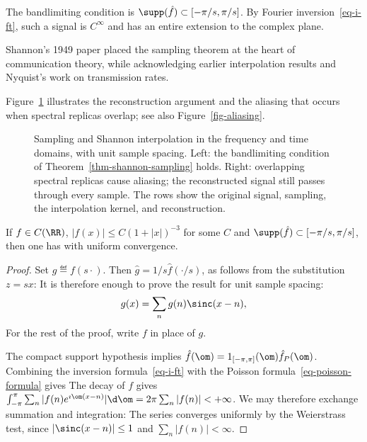 The bandlimiting condition is $\supp(\hat f) \subset [-\pi/s,\pi/s]$. By Fourier inversion~\eqref{eq-i-ft}, such a signal is $C^\infty$ and has an entire extension to the complex plane.
 
Shannon's 1949 paper placed the sampling theorem at the heart of communication theory, while acknowledging earlier interpolation results and Nyquist's work on transmission rates.
 
Figure~\ref{fig-sampling-aliasing} illustrates the reconstruction argument and the aliasing that occurs when spectral replicas overlap; see also Figure~\ref{fig-aliasing}.

\begin{figure}[tbp]
\centering
{}
\caption{Sampling and Shannon interpolation in the frequency and time domains, with unit sample spacing. Left: the bandlimiting condition of Theorem~\ref{thm-shannon-sampling} holds. Right: overlapping spectral replicas cause aliasing; the reconstructed signal still passes through every sample. The rows show the original signal, sampling, the interpolation kernel, and reconstruction.}
\label{fig-sampling-aliasing}
\end{figure}





\begin{thm} \label{thm-shannon-sampling}
	If $f\in C(\RR)$, $|f(x)| \leq C(1+|x|)^{-3}$ for some $C$ and $\supp(\hat f) \subset [-\pi/s,\pi/s]$, then one has
	with uniform convergence.
\end{thm}

\begin{proof} 
	Set $g \eqdef f(s \cdot)$. Then $\hat g=1/s \hat f(\cdot/s)$, as follows from the substitution $z=s x$:
	It is therefore enough to prove the result for unit sample spacing:
	$$
		g(x) = \sum_n g(n) \sinc(x-n), 
	$$
	For the rest of the proof, write $f$ in place of $g$.
	 
	The compact support hypothesis implies $\hat f(\om) = 1_{[-\pi,\pi]}(\om) \hat f_P(\om)$.  
	Combining the inversion formula~\eqref{eq-i-ft} with the Poisson formula~\eqref{eq-poisson-formula} gives
	The decay of $f$ gives $\int_{-\pi}^\pi \sum_n |f(n) e^{\imath \om (x-n)}| \d \om = 2\pi\sum_n |f(n)| < +\infty$. We may therefore exchange summation and integration:
The series converges uniformly by the Weierstrass test, since $|\sinc(x-n)|\leq 1$ and $\sum_n|f(n)|<\infty$.
\end{proof}

